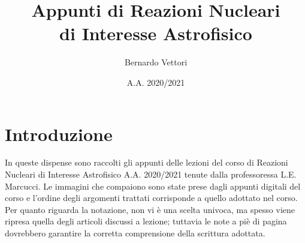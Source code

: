 \documentclass[12pt,a4paper,titlepage,openany]{book}
\title{Appunti di Reazioni Nucleari\\di Interesse Astrofisico}
\author{Bernardo Vettori}
\date{A.A. 2020/2021}
\newcommand\blankpage{
    \null
    \thispagestyle{empty}
    \addtocounter{page}{-1}
    \newpage
    }
\begin{document}
\frontmatter
\maketitle
\chapter*{Introduzione}
\noindent In queste dispense sono raccolti gli appunti delle lezioni del corso di Reazioni Nucleari di Interesse Astrofisico A.A. 2020/2021 tenute dalla professoressa L.E. Marcucci. Le immagini che compaiono sono state prese dagli appunti digitali del corso e l'ordine degli argomenti trattati corrisponde a quello adottato nel corso.\\
Per quanto riguarda la notazione, non vi è una scelta univoca, ma spesso viene ripresa quella degli articoli discussi a lezione; tuttavia le note a piè di pagina dovrebbero garantire la corretta comprensione della scrittura adottata.
\tableofcontents
\mainmatter




\afterpage{\blankpage}
\printindex
\listoffigures{}
\end{document}
